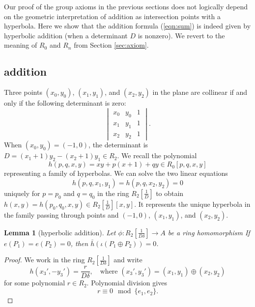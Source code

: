 \documentclass[12pt]{article}
\newtheorem{lemma}[theorem]{Lemma}
\newcommand{\f}[1]{\frac{1}{#1}}
\begin{document}
Our proof of the group axioms in the previous sections does not
logically depend on the geometric interpretation of addition as
intersection points with a hyperbola.  Here we show that the addition
formula (\ref{eqn:sum}) is indeed given by hyperbolic addition (when a
determinant $D$ is nonzero).  We revert to the meaning of $R_0$ and
$R_n$ from Section \ref{sec:axiom}.

\subsection{addition}

Three points $(x_0,y_0)$, $(x_1,y_1)$, and $(x_2,y_2)$ in the plane
are collinear if and only if the following determinant is zero:
\[
\begin{vmatrix}
x_0 & y_0 & 1\\
x_1 & y_1 & 1\\
x_2 & y_2 & 1
\end{vmatrix}.
\]
When $(x_0,y_0) = (-1,0)$, the determinant
is $D= (x_1+1) y_2 - (x_2+1) y_1\in R_2$. 
We recall the polynomial
\[
h(p,q,x,y) = x y + p (x+1) + q y \in R_0[p,q,x,y]
\]
representing a family of hyperbolas.
We can solve the two linear equations
\begin{equation}\label{eqn:pq}
h(p,q,x_1,y_1)=h(p,q,x_2,y_2)=0
\end{equation}
uniquely for $p=p_0$ and $q=q_0$ in the ring $R_2[\f{D}]$ to obtain
$h(x,y) = h(p_0,q_0,x,y) \in R_2[\f{D}][x,y]$.  It represents the
unique hyperbola in the family passing through points and $(-1,0)$,
$(x_1,y_1)$, and $(x_2,y_2)$.
 
\begin{lemma}[hyperbolic addition]\label{lemma:hyperbola}
  Let $\phi:R_2[\f{D\delta}]\to A$ be a ring homomorphism 
  If $e(P_1) =  e(P_2) = 0$, then
  $\bar h(\iota(P_1\oplus P_2))=0$.
\end{lemma}

\begin{proof}
  We work in the ring $R_2[\f{D\delta}]$ and write
\[
h(x_3',-y_3') = \frac{r}{D\delta},\quad 
\text{where } (x_3',y_3') = (x_1,y_1)\oplus (x_2,y_2)
\]
for some polynomial $r \in R_2$.  Polynomial division gives
\begin{equation}\label{eqn:h}
r \equiv 0 \mod \{e_1,e_2\}.
\end{equation}
\end{proof}
\end{document}
